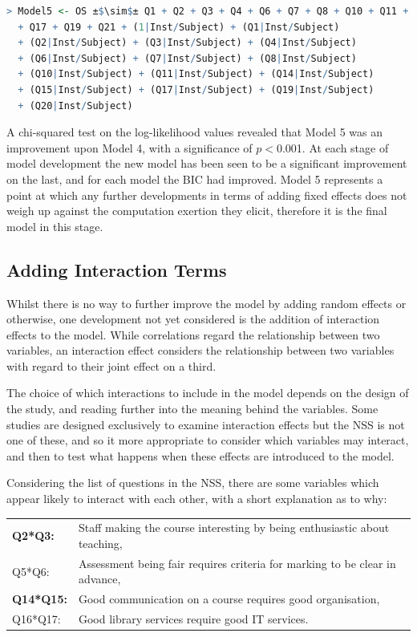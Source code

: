\documentclass[11pt,a4paper]{report}
\begin{document}
\newpage
{\footnotesize
\begin{lstlisting}[backgroundcolor = \color{light-gray}, language=R, escapechar=±]
 > Model5 <- OS ±$\sim$± Q1 + Q2 + Q3 + Q4 + Q6 + Q7 + Q8 + Q10 + Q11 + Q14 + Q15
  + Q17 + Q19 + Q21 + (1|Inst/Subject) + (Q1|Inst/Subject)
  + (Q2|Inst/Subject) + (Q3|Inst/Subject) + (Q4|Inst/Subject) 
  + (Q6|Inst/Subject) + (Q7|Inst/Subject) + (Q8|Inst/Subject)
  + (Q10|Inst/Subject) + (Q11|Inst/Subject) + (Q14|Inst/Subject)
  + (Q15|Inst/Subject) + (Q17|Inst/Subject) + (Q19|Inst/Subject)
  + (Q20|Inst/Subject)
\end{lstlisting}
}
A chi-squared test on the log-likelihood values revealed that Model 5 was an improvement upon Model 4, with a significance of $p<$0.001. At each stage of model development the new model has been seen to be a significant improvement on the last, and for each model the BIC had improved. Model 5 represents a point at which any further developments in terms of adding fixed effects does not weigh up against the computation exertion they elicit, therefore it is the final model in this stage. 

\subsection{Adding Interaction Terms}
Whilst there is no way to further improve the model by adding random effects or otherwise, one development not yet considered is the addition of interaction effects to the model. While correlations regard the relationship between two variables, an interaction effect considers the relationship between two variables with regard to their joint effect on a third.  	

The choice of which interactions to include in the model depends on the design of the study, and reading further into the meaning behind the variables. Some studies are designed exclusively to examine interaction effects but the NSS is not one of these, and so it more appropriate to consider which variables may interact, and then to test what happens when these effects are introduced to the model. 

Considering the list of questions in the NSS, there are some variables which appear likely to interact with each other, with a short explanation as to why:

\begin{tabular}{ll}
\textbf{Q2*Q3:} & Staff making the course interesting by being enthusiastic about teaching,\\
Q5*Q6: & Assessment being fair requires criteria for marking to be clear in advance, \\
\textbf{Q14*Q15:} & Good communication on a course requires good organisation,\\
Q16*Q17: & Good library services require good IT services.
\end{tabular}\\
\end{document}
